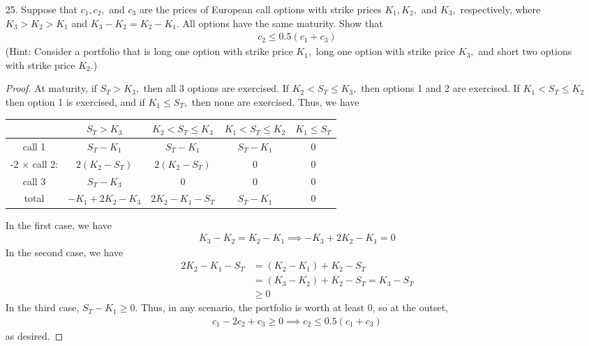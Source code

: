 \documentclass{article}
\begin{document}
\begin{itemize}
	\item[25.] Suppose that $c_1, c_2,$ and $c_3$ are the prices of European call options with strike prices $K_1, K_2,$ and $K_3,$ respectively, where $K_3>K_2>K_1$ and $K_3-K_2=K_2-K_1.$ All options have the same maturity. Show that
		\begin{align*}
			c_2\le 0.5(c_1+c_3)
		\end{align*}
		(Hint: Consider a portfolio that is long one option with strike price $K_1,$ long one option with strike price $K_3,$ and short two options with strike price $K_2.$)
		\begin{proof}
			At maturity, if $S_T>K_3,$ then all 3 options are exercised. If $K_2<S_T\le K_3,$ then options 1 and 2 are exercised. If $K_1<S_T\le K_2$ then option 1 is exercised, and if $K_1\le S_T,$ then none are exercised. Thus, we have
			\begin{center}
				\begin{tabular}{c|cccc}
					& $S_T>K_3$ & $K_2<S_T\le K_3$ & $K_1 < S_T\le K_2$ & $K_1\le S_T$ \\
					\hline
					call 1 & $S_T-K_1$ & $S_T-K_1$ & $ S_T-K_1$ & 0 \\
					-2 $\times$ call 2: & $2(K_2-S_T)$ & $2(K_2-S_T)$ & 0 & 0 \\	
					call 3 & $S_T-K_3$ & 0 & 0 & 0 \\
					\hline
					total & $-K_1+2K_2-K_3$ & $2K_2-K_1-S_T$ & $S_T-K_1$ & 0
				\end{tabular}
			\end{center}
			In the first case, we have 
			\begin{align*}
				K_3-K_2=K_2-K_1\implies -K_3+2K_2-K_1=0
			\end{align*}
			In the second case, we have
			\begin{align*}
				2K_2-K_1-S_T &= (K_2-K_1)+K_2-S_T \\
				&= (K_3-K_2)+K_2-S_T = K_3 - S_T \\
				&\ge 0
			\end{align*}
			In the third case, $S_T-K_1\ge 0.$ Thus, in any scenario, the portfolio is worth at least 0, so at the outset,
			\begin{align*}
				c_1-2c_2+c_3 \ge 0 \implies c_2\le 0.5(c_1+c_3)
			\end{align*}
			as desired.
		\end{proof}
		
\end{itemize}
\end{document}
